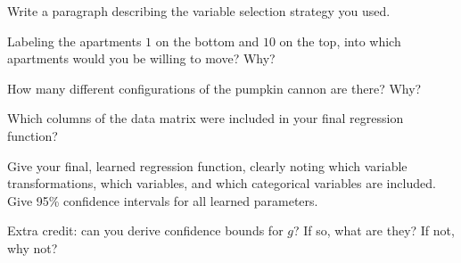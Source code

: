 \documentclass[12pt]{article}
\begin{document}
{
Write a paragraph describing the variable selection strategy you used.
}
 { \vfill \answer } %
 {  %
 }

{
Labeling the apartments $1$ on the bottom and $10$ on the top, into which apartments would you be willing to move?  Why? 
}
 { \vfill \answer } %
 {  %
 }

{
How many different configurations of the pumpkin cannon are there?  Why?
}
 { \vfill \answer } %
 {  %
 }

{
Which columns of the data matrix were included in your final regression function?
}
 { \vfill \answer } %
 {  %
 }

{
Give your final, learned regression function, clearly noting which variable transformations, which  variables, and which categorical variables are included.  Give 95\% confidence intervals for all learned parameters.
}
 { \vfill \answer } %
 {  %
 }

{
Extra credit: can you derive confidence bounds for $g$?  If so, what are they?  If not, why not?
}
 { \vfill \answer } %
 {  %
 }


\problemsdone
\end{document}
